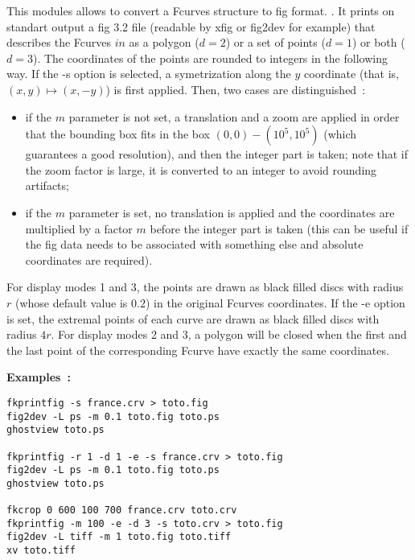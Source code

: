 This modules allows to convert a Fcurves structure to fig format.
.
It prints on standart output a fig 3.2 file (readable
by {\sf xfig} or {\sf fig2dev} for example) that describes the
Fcurves $in$ as a polygon ($d=2$) or a set of points ($d=1$) or both
($d=3$). The coordinates of the points are rounded to integers
in the following way. If the {\sf -s} option is selected,
a symetrization along the $y$ coordinate (that is, $(x,y)\mapsto (x,-y)$)
is first applied. Then, two cases are distinguished~:
\begin{itemize}
\item if the $m$ parameter is not set, a translation and a zoom
are applied in order that the bounding box fits in
the box $(0,0)-(10^5,10^5)$ (which guarantees a good resolution),
and then the integer part is taken;
note that if the zoom factor is large, it is converted to
an integer to avoid rounding artifacts;
\item if the $m$ parameter is set, no translation is applied and 
the coordinates are multiplied by a factor $m$ before 
the integer part is taken (this can be useful if the fig data needs 
to be associated with something else and absolute coordinates are required).
\end{itemize}
For display modes 1 and 3, the points are drawn as black filled discs
with radius $r$ (whose default value is $0.2$) in the original Fcurves 
coordinates. If the {\sf -e} option is set, the extremal points of
each curve are drawn as black filled discs with radius $4r$.
For display modes 2 and 3, a polygon will be closed when the 
first and the last point of the corresponding Fcurve have exactly
the same coordinates.


{\bf Examples~:}
\begin{verbatim}
fkprintfig -s france.crv > toto.fig
fig2dev -L ps -m 0.1 toto.fig toto.ps
ghostview toto.ps

fkprintfig -r 1 -d 1 -e -s france.crv > toto.fig
fig2dev -L ps -m 0.1 toto.fig toto.ps
ghostview toto.ps

fkcrop 0 600 100 700 france.crv toto.crv
fkprintfig -m 100 -e -d 3 -s toto.crv > toto.fig
fig2dev -L tiff -m 1 toto.fig toto.tiff
xv toto.tiff
\end{verbatim}

